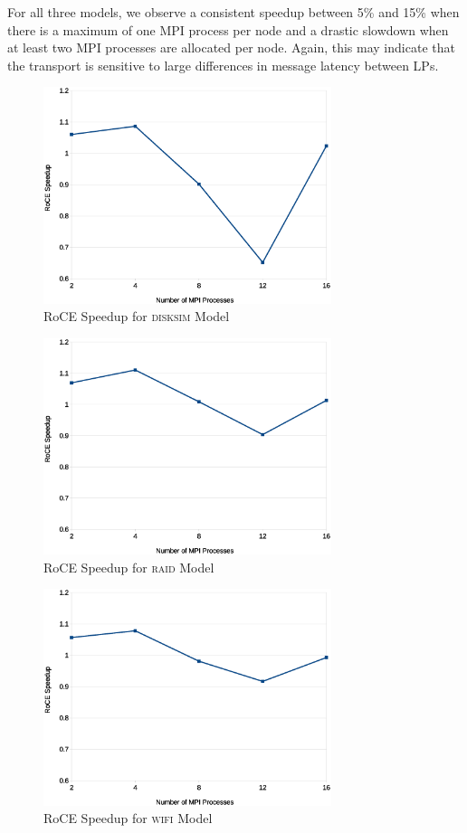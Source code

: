 \documentclass[11pt]{book}
\begin{document}
For all three models, we observe a consistent speedup between 5\% and 15\% when
there is a maximum of one MPI process per node and a drastic slowdown when
at least two MPI processes are allocated per node. Again, this may indicate that
the transport is sensitive to large differences in message latency between LPs.

\begin{figure}
\centering
\includegraphics[width=0.75\textwidth]{disksim_speedup}
\caption{RoCE Speedup for \textsc{disksim} Model}
\label{disksim-speedup}
\end{figure}

\begin{figure}
\centering
\includegraphics[width=0.75\textwidth]{raid_speedup}
\caption{RoCE Speedup for \textsc{raid} Model}
\label{raid-speedup}
\end{figure}

\begin{figure}
\centering
\includegraphics[width=0.75\textwidth]{wifi_speedup}
\caption{RoCE Speedup for \textsc{wifi} Model}
\label{wifi-speedup}
\end{figure}
\end{document}
